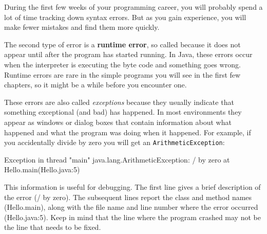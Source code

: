 \documentclass[12pt]{book}
\makeatletter
\theoremstyle{exercise}
\newcommand{\java}[1]{\verb"#1"}
\renewcommand\subsection{\@startsection{subsection}{2}{\z@}%
    {-3.25ex\@plus -1ex \@minus -.2ex}%
    {0.3ex \@plus .2ex}%
    {\normalfont\large\bfseries}}
\newcommand{\java}[1]{\lstinline{#1}} %
\makeatother
\begin{document}
During the first few weeks of your programming career, you will probably spend a lot of time tracking down syntax errors.
But as you gain experience, you will make fewer mistakes and find them more quickly.



The second type of error is a {\bf runtime error}, so called because it does not appear until after the program has started running.
In Java, these errors occur when the interpreter is executing the byte code and something goes wrong.
Runtime errors are rare in the simple programs you will see in the first few chapters, so it might be a while before you encounter one.


These errors are also called {\em exceptions} because they usually indicate that something exceptional (and bad) has happened.
In most environments they appear as windows or dialog boxes that contain information about what happened and what the program was doing when it happened.
For example, if you accidentally divide by zero you will get an \java{ArithmeticException}:

\begin{small}
\begin{stdout}
Exception in thread "main" java.lang.ArithmeticException: / by zero
    at Hello.main(Hello.java:5)
\end{stdout}
\end{small}

This information is useful for debugging.
The first line gives a brief description of the error (/ by zero).
The subsequent lines report the class and method names (Hello.main), along with the file name and line number where the error occurred (Hello.java:5).
Keep in mind that the line where the program crashed may not be the line that needs to be fixed.

\end{document}
